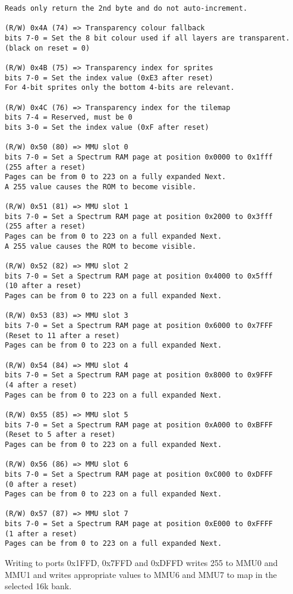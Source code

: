 \begin{verbatim}
Reads only return the 2nd byte and do not auto-increment.

(R/W) 0x4A (74) => Transparency colour fallback
bits 7-0 = Set the 8 bit colour used if all layers are transparent.
(black on reset = 0)

(R/W) 0x4B (75) => Transparency index for sprites
bits 7-0 = Set the index value (0xE3 after reset)
For 4-bit sprites only the bottom 4-bits are relevant.

(R/W) 0x4C (76) => Transparency index for the tilemap
bits 7-4 = Reserved, must be 0
bits 3-0 = Set the index value (0xF after reset)

(R/W) 0x50 (80) => MMU slot 0
bits 7-0 = Set a Spectrum RAM page at position 0x0000 to 0x1fff
(255 after a reset)
Pages can be from 0 to 223 on a fully expanded Next.
A 255 value causes the ROM to become visible.

(R/W) 0x51 (81) => MMU slot 1
bits 7-0 = Set a Spectrum RAM page at position 0x2000 to 0x3fff
(255 after a reset)
Pages can be from 0 to 223 on a full expanded Next.
A 255 value causes the ROM to become visible.

(R/W) 0x52 (82) => MMU slot 2
bits 7-0 = Set a Spectrum RAM page at position 0x4000 to 0x5fff
(10 after a reset)
Pages can be from 0 to 223 on a full expanded Next.

(R/W) 0x53 (83) => MMU slot 3
bits 7-0 = Set a Spectrum RAM page at position 0x6000 to 0x7FFF
(Reset to 11 after a reset)
Pages can be from 0 to 223 on a full expanded Next.

(R/W) 0x54 (84) => MMU slot 4
bits 7-0 = Set a Spectrum RAM page at position 0x8000 to 0x9FFF
(4 after a reset)
Pages can be from 0 to 223 on a full expanded Next.

(R/W) 0x55 (85) => MMU slot 5
bits 7-0 = Set a Spectrum RAM page at position 0xA000 to 0xBFFF
(Reset to 5 after a reset)
Pages can be from 0 to 223 on a full expanded Next.

(R/W) 0x56 (86) => MMU slot 6
bits 7-0 = Set a Spectrum RAM page at position 0xC000 to 0xDFFF
(0 after a reset)
Pages can be from 0 to 223 on a full expanded Next.

(R/W) 0x57 (87) => MMU slot 7
bits 7-0 = Set a Spectrum RAM page at position 0xE000 to 0xFFFF
(1 after a reset)
Pages can be from 0 to 223 on a full expanded Next.
\end{verbatim}
Writing to ports 0x1FFD, 0x7FFD and 0xDFFD writes 255 to MMU0 and MMU1
and writes appropriate values to MMU6 and MMU7 to map in the selected 16k bank.


